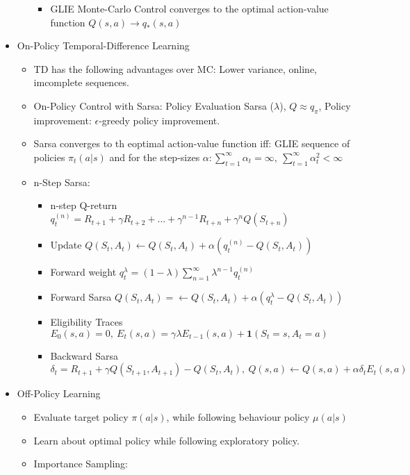 \begin{itemize}[noitemsep,nolistsep]
\begin{itemize}
\begin{itemize}[noitemsep,nolistsep]
			\item GLIE Monte-Carlo Control converges to the optimal action-value function $Q(s,a) \rightarrow q_*(s,a)$
		\end{itemize}
	\end{itemize}
	\item On-Policy Temporal-Difference Learning
	\begin{itemize}[noitemsep,nolistsep]
		\item TD has the following advantages over MC: Lower variance, online, imcomplete sequences.
		\item On-Policy Control with Sarsa: Policy Evaluation Sarsa ($\lambda$), $Q \approx q_\pi$, Policy improvement: $\epsilon$-greedy policy improvement.
		\item Sarsa converges to th eoptimal action-value function iff: GLIE sequence of policies $\pi_t(a|s)$ and for the step-sizes $\alpha: \sum_{t=1}^\infty \alpha_t = \infty,\ \sum_{t=1}^\infty \alpha_t^2 < \infty$
		\item n-Step Sarsa:
		\begin{itemize}[noitemsep,nolistsep]
			\item n-step Q-return $q_t^{(n)} = R_{t+1} + \gamma R_{t+2} + ... + \gamma^{n-1}R_{t+n} + \gamma^n Q(S_{t+n})$
			\item Update $Q(S_t,A_t) \leftarrow Q(S_t,A_t) + \alpha(q_t^{(n)} - Q(S_t,A_t))$
			\item Forward weight $q_t^\lambda = (1-\lambda)\sum_{n=1}^\infty \lambda^{n-1}q_t^{(n)}$
			\item Forward Sarsa $Q(S_t,A_t) = \leftarrow Q(S_t,A_t) + \alpha(q_t^\lambda - Q(S_t,A_t))$
			\item Eligibility Traces $E_0(s,a) = 0,\ E_t(s,a) = \gamma \lambda E_{t-1}(s,a) + \textbf{1}(S_t = s, A_t = a)$
			\item Backward Sarsa $\delta_t = R_{t+1} + \gamma Q(S_{t+1}, A_{t+1}) - Q(S_t,A_t),
			\ Q(s,a) \leftarrow Q(s,a) + \alpha \delta_t E_t(s,a)$
		\end{itemize}
	\end{itemize}
	\item Off-Policy Learning
	\begin{itemize}[noitemsep,nolistsep]
		\item Evaluate target policy $\pi(a|s)$, while following behaviour policy $\mu(a|s)$
		\item Learn about optimal policy while following exploratory policy.
		\item Importance Sampling:
		\begin{itemize}

\end{itemize}
\end{itemize}
\end{itemize}
